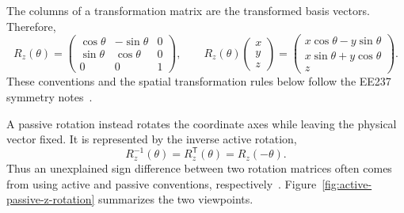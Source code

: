 The columns of a transformation matrix are the transformed basis vectors.
Therefore,
\begin{equation}
    R_z(\theta)=
    \begin{pmatrix}
        \cos\theta & -\sin\theta & 0 \\
        \sin\theta & \cos\theta  & 0 \\
        0          & 0           & 1
    \end{pmatrix},
    \qquad
    R_z(\theta)\begin{pmatrix}x\\y\\z\end{pmatrix}
    =\begin{pmatrix}
        x\cos\theta-y\sin\theta \\
        x\sin\theta+y\cos\theta \\
        z
    \end{pmatrix}.
    \label{eq:z-axis-rotation-matrix}
\end{equation}
These conventions and the spatial transformation rules below follow the EE237
symmetry notes~\cite{ee237-week11}.

A passive rotation instead rotates the coordinate axes while leaving the
physical vector fixed.  It is represented by the inverse active rotation,
\begin{equation}
    R_z^{-1}(\theta)=R_z^{\mathsf T}(\theta)=R_z(-\theta).
    \label{eq:active-passive-z-rotation}
\end{equation}
Thus an unexplained sign difference between two rotation matrices often comes
from using active and passive conventions, respectively~\cite{ee237-week11}.
Figure~\ref{fig:active-passive-z-rotation} summarizes the two viewpoints.

